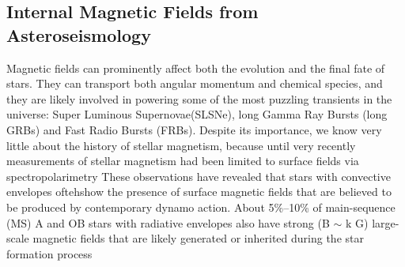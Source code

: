{\color{red}\subsection{Internal Magnetic Fields from Asteroseismology}}
Magnetic fields can prominently affect both the evolution and the final fate of stars. They can transport both angular momentum and chemical species, and they are likely involved in powering some of the most puzzling transients in the universe: Super Luminous Supernovae(SLSNe), long Gamma Ray Bursts (long GRBs) and Fast Radio Bursts (FRBs). Despite its importance, we know very little about the history of stellar magnetism, because until very recently measurements of stellar magnetism had been limited to surface fields via spectropolarimetry
These observations have revealed that stars with convective envelopes oftehshow the presence of surface magnetic fields that are believed to be produced by contemporary dynamo action. About 5\%–10\% of main-sequence (MS) A and OB stars with radiative envelopes also have strong (B $\sim$ k G) large-scale magnetic fields that are likely generated or inherited during the star formation process  \citep[fossil fields, see e.g.,][]{2012ASPC..464..405W}